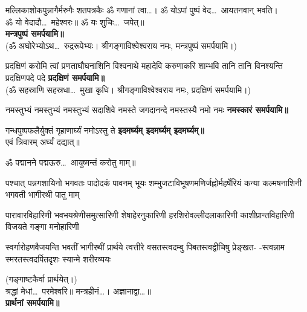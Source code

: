 \begin{center}

{मल्लिकाशोकपुन्नागैर्मरुगैः शतपत्रकैः}
ॐ गणानां त्वा\ldots। ॐ योऽपां पुष्पं वेद\ldots\ आयतनवान् भवति।\\
ॐ यो वेदादौ\ldots\ महेश्वरः॥ ॐ यः शुचिः\ldots\ जपेत्॥\\
\textbf{\devAya{} मन्त्रपुष्पं समर्पयामि॥}\\
(ॐ अघोरेभ्योऽथ\ldots\ रुद्ररूपेभ्यः। श्रीगङ्गाविश्वेश्वराय नमः, मन्त्रपुष्पं समर्पयामि।)


{प्रदक्षिणं करोमि त्वां प्रणताघौघनाशिनि}
{विश्वनाथे महादेवि करुणाकरि शाम्भवि}
{तानि तानि विनश्यन्ति प्रदक्षिणपदे पदे}
\textbf{\devAya{} प्रदक्षिणं समर्पयामि॥}\\
(ॐ सहस्राणि सहस्रधा\ldots\ मुखा कृधि। श्रीगङ्गाविश्वेश्वराय नमः, प्रदक्षिणं समर्पयामि।)

{नमस्तुभ्यं नमस्तुभ्यं नमस्तुभ्यं सदाशिवे}
{नमस्ते जगदानन्दे नमस्तस्यै नमो नमः}
\textbf{\devAya{} नमस्कारं समर्पयामि॥}


{गन्धपुष्पफलैर्युक्तं गृहाणार्घ्यं नमोऽस्तु ते}
\textbf{\devAya{} इदमर्घ्यम् इदमर्घ्यम् इदमर्घ्यम्॥}\\
एवं त्रिवारम् अर्घ्यं दद्यात्॥


ॐ पद्मानने पद्मऊरु\ldots\ आयुष्मन्तं करोतु माम्॥

{पश्चात् पन्नगशायिनो भगवतः पादोदकं पावनम्}
{भूयः शम्भुजटाविभूषणमणिर्जह्नोर्महर्षेरियं}
{कन्या कल्मषनाशिनी भगवती भागीरथी पातु माम्}

{पारावारविहारिणी भवभयश्रेणीसमुत्सारिणी}
{शेषाहेरनुकारिणी हरशिरोवल्लीदलाकारिणी}
{काशीप्रान्तविहारिणी विजयते गङ्गा मनोहारिणी}

{स्वर्गारोहणवैजयन्ति भवतीं भागीरथीं प्रार्थये}
{त्वत्तीरे वसतस्त्वदम्बु पिबतस्त्वद्वीचिषु प्रेङ्खत-}
{-स्त्वन्नाम स्मरतस्त्वदर्पितदृशः स्यान्मे शरीरव्ययः}

(गङ्गाष्टकैर्वा प्रार्थयेत्।)\\
श्रद्धां मेधां\ldots\ परमेश्वरि॥ मन्त्रहीनं\ldots। अज्ञानाद्वा\ldots॥\\
\textbf{\devAya{} प्रार्थनां समर्पयामि॥}
\end{center}

